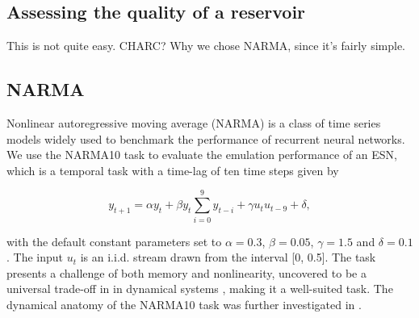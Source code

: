 


\subsection{Assessing the quality of a reservoir}

This is not quite easy. CHARC? Why we chose NARMA, since it's fairly simple.


\subsection{NARMA}

Nonlinear autoregressive moving average (NARMA) \cite{atiya_new_2000} is a class
of time series models widely used to benchmark the performance of recurrent
neural networks. We use the NARMA10 task to evaluate the emulation performance
of an ESN, which is a temporal task with a time-lag of ten time steps given by


\begin{equation}
  y_{t+1} = \alpha y_{t} +
  \beta y_{t} \sum_{i=0}^{9}y_{t-i} +
  \gamma u_{t}u_{t-9} +
  \delta,
  \label{narma}
\end{equation}

\noindent with the default constant parameters set to $\alpha = 0.3$, $\beta =
0.05$, $\gamma = 1.5$ and $\delta = 0.1$. The input $u_{t}$ is an i.i.d. stream
drawn from the interval [0, 0.5]. The task presents a challenge of both memory
and nonlinearity, uncovered to be a universal trade-off in in dynamical systems
\cite{dambre_information_2012, verstraeten_memory_2010}, making it a well-suited
task. The dynamical anatomy of the NARMA10 task was further investigated in
\cite{kubota_dynamical_2019}.




